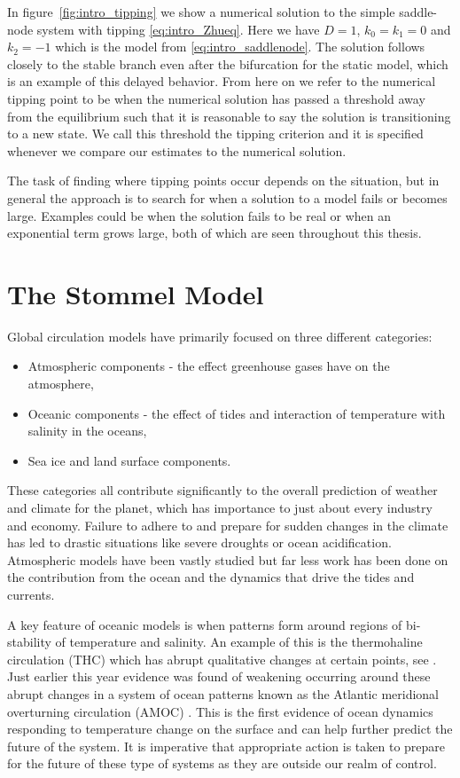 \indent In figure~\ref{fig:intro_tipping} we show a numerical solution to the simple saddle-node system with tipping \eqref{eq:intro_Zhueq}.  Here we have $D=1$, $k_0=k_1=0$ and $k_2=-1$ which is the model from \eqref{eq:intro_saddlenode}. The solution follows closely to the stable branch even after the bifurcation for the static model, which is an example of this delayed behavior. From here on we refer to the numerical tipping point to be when the numerical solution has passed a threshold away from the equilibrium such that it is reasonable to say the solution is transitioning to a new state. We call this threshold the tipping criterion and it is specified whenever we compare our estimates  to the numerical solution.

The task of finding where tipping points occur depends on the situation, but in general the approach is to search for when a solution to a model fails or becomes large. Examples could be when the solution fails to be real or when an exponential term grows large, both of which are seen throughout this thesis.


\section*{The Stommel Model}

Global circulation models have primarily focused on three different categories: 

\begin{itemize}
\setlength\itemsep{1em}
\item Atmospheric components - the effect greenhouse gases have on the atmosphere,
\item Oceanic components - the effect of tides and interaction of temperature with salinity in the oceans,
\item Sea ice and land surface components.
\end{itemize}

These categories all contribute significantly to the overall prediction of weather and climate for the planet, which has importance to just about every industry and economy. Failure to adhere to and prepare for sudden changes in the climate has led to drastic situations like severe droughts or ocean acidification. Atmospheric models have been vastly studied but far less work has been done on the contribution from the ocean and the dynamics that drive the tides and currents.

\indent A key feature of oceanic models is when patterns form around regions of bi-stability of temperature and salinity. An example of this is the thermohaline circulation (THC) which has abrupt qualitative changes at certain points, see \cite{alley2003abrupt,marotzke2000abrupt,rahmstorf2000thermohaline,rahmstorf2002ocean}. Just earlier this year evidence was found of weakening occurring around these abrupt changes in a system of ocean patterns known as the Atlantic meridional overturning circulation (AMOC) \cite{caesar2018AMOC}. This is the first evidence of ocean dynamics responding to temperature change on the surface and can help further predict the future of the system. It is imperative that appropriate action is taken to prepare for the future of these type of systems as they are outside our realm of control. 

